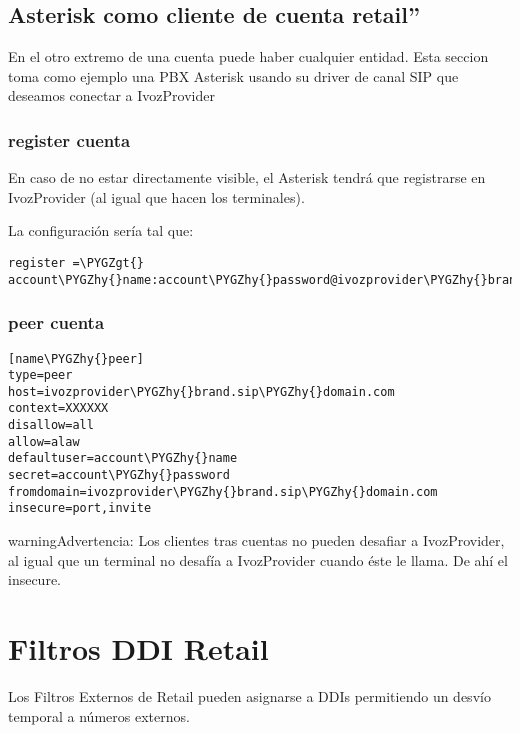 \documentclass[letterpaper,10pt,spanish]{sphinxmanual}
\def\PYGZgt{\char`\>}
\def\PYGZhy{\char`\-}
\begin{document}
\subsection{Asterisk como cliente de cuenta retail''}
\label{retail/retail_accounts:asterisk-as-an-account-client}
En el otro extremo de una cuenta puede haber cualquier entidad. Esta seccion toma como ejemplo una PBX Asterisk usando su driver de canal SIP que deseamos conectar a IvozProvider


\subsubsection{register cuenta}
\label{retail/retail_accounts:account-register}
En caso de no estar directamente visible, el Asterisk tendrá que registrarse en IvozProvider (al igual que hacen los terminales).

La configuración sería tal que:

\begin{Verbatim}[commandchars=\\\{\}]
register =\PYGZgt{} account\PYGZhy{}name:account\PYGZhy{}password@ivozprovider\PYGZhy{}brand.sip\PYGZhy{}domain.com
\end{Verbatim}


\subsubsection{peer cuenta}
\label{retail/retail_accounts:account-peer}
\begin{Verbatim}[commandchars=\\\{\}]
[name\PYGZhy{}peer]
type=peer
host=ivozprovider\PYGZhy{}brand.sip\PYGZhy{}domain.com
context=XXXXXX
disallow=all
allow=alaw
defaultuser=account\PYGZhy{}name
secret=account\PYGZhy{}password
fromdomain=ivozprovider\PYGZhy{}brand.sip\PYGZhy{}domain.com
insecure=port,invite
\end{Verbatim}

\begin{notice}{warning}{Advertencia:}
Los clientes tras cuentas no pueden desafiar a IvozProvider, al igual que un terminal no desafía a IvozProvider cuando éste le llama. De ahí el insecure.
\end{notice}


\section{Filtros DDI Retail}
\label{retail/retail_filters:retail-ddi-filters}\label{retail/retail_filters::doc}\label{retail/retail_filters:retail-filters}
Los Filtros Externos de Retail pueden asignarse a DDIs permitiendo un desvío temporal a números externos.
\end{document}
